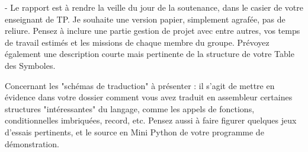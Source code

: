 \documentclass[a4paper, 12pt]{report}
\begin{document}
   - Le rapport est à rendre la veille du  jour de la soutenance, dans le casier de votre enseignant de TP. Je souhaite une version papier, simplement agrafée, pas de reliure.  Pensez à inclure une partie gestion de projet avec entre autres, vos temps de travail estimés et les missions de chaque membre du groupe.
Prévoyez également une description courte mais pertinente de la structure de votre Table des Symboles.

Concernant les "schémas de traduction" à présenter : il s'agit de mettre en évidence dans votre dossier comment vous avez traduit en assembleur certaines structures "intéressantes" du langage, comme les appels de fonctions, conditionnelles imbriquées, record, etc.
Pensez aussi à faire figurer quelques jeux d'essais pertinents, et le source en Mini Python de votre programme de démonstration.
\end{document}
